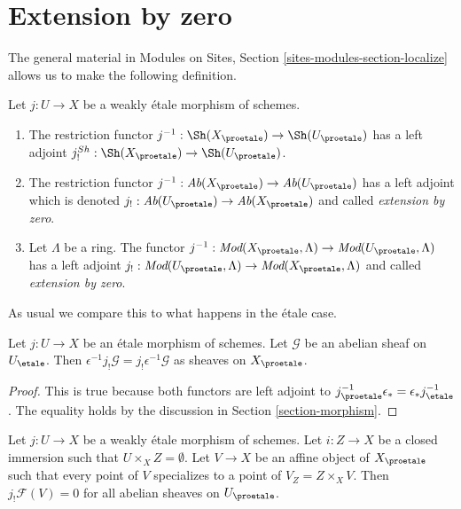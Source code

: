 \section{Extension by zero}
\label{section-extension-by-zero}

\noindent
The general material in
Modules on Sites, Section \ref{sites-modules-section-localize}
allows us to make the following definition.

\begin{definition}
\label{definition-extension-zero}
Let $j : U \to X$ be a weakly \'etale morphism of schemes.
\begin{enumerate}
\item The restriction functor
$j^{-1} : \Sh(X_\proetale) \to \Sh(U_\proetale)$
has a left adjoint
$j_!^{Sh} : \Sh(X_\proetale) \to \Sh(U_\proetale)$.
\item The restriction functor
$j^{-1} : \textit{Ab}(X_\proetale) \to \textit{Ab}(U_\proetale)$
has a left adjoint which is denoted
$j_! : \textit{Ab}(U_\proetale) \to \textit{Ab}(X_\proetale)$
and called {\it extension by zero}.
\item Let $\Lambda$ be a ring. The functor
$j^{-1} : \textit{Mod}(X_\proetale, \Lambda) \to
\textit{Mod}(U_\proetale, \Lambda)$
has a left adjoint
$j_! : \textit{Mod}(U_\proetale, \Lambda) \to
\textit{Mod}(X_\proetale, \Lambda)$
and called {\it extension by zero}.
\end{enumerate}
\end{definition}

\noindent
As usual we compare this to what happens in the \'etale case.

\begin{lemma}
\label{lemma-jshriek-comparison}
Let $j : U \to X$ be an \'etale morphism of schemes.
Let $\mathcal{G}$ be an abelian sheaf on $U_\etale$.
Then $\epsilon^{-1} j_!\mathcal{G} = j_!\epsilon^{-1}\mathcal{G}$
as sheaves on $X_\proetale$.
\end{lemma}

\begin{proof}
This is true because both functors are left adjoint to
$j_\proetale^{-1} \epsilon_* = \epsilon_* j_\etale^{-1}$.
The equality holds by the discussion in Section \ref{section-morphism}.
\end{proof}

\begin{lemma}
\label{lemma-jshriek-zero}
Let $j : U \to X$ be a weakly \'etale morphism of schemes.
Let $i : Z \to X$ be a closed immersion such that $U \times_X Z = \emptyset$.
Let $V \to X$ be an affine object of $X_\proetale$ such that every point
of $V$ specializes to a point of $V_Z = Z \times_X V$.
Then $j_!\mathcal{F}(V) = 0$ for all abelian sheaves on $U_\proetale$.
\end{lemma}

